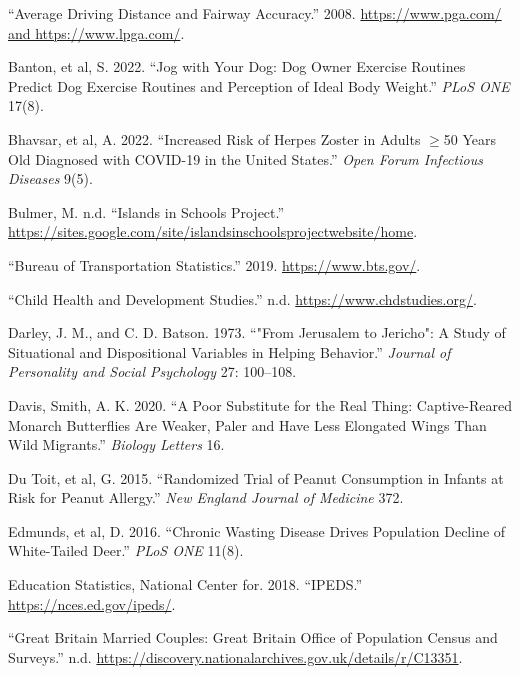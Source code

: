 \documentclass[
]{report}
\newlength{\cslhangindent}
\newenvironment{CSLReferences}[2] %
 {\begin{list}{}{%
  \setlength{\itemindent}{0pt}
  \setlength{\leftmargin}{0pt}
  \setlength{\parsep}{0pt}
  \ifodd #1
   \setlength{\leftmargin}{\cslhangindent}
   \setlength{\itemindent}{-1\cslhangindent}
  \fi
  \setlength{\itemsep}{#2\baselineskip}}}
 {\end{list}}
\begin{document}
\label{refs}
\begin{CSLReferences}{1}{0}
{``Average Driving Distance and Fairway Accuracy.''} 2008. \href{https://www.pga.com/\%20and\%20https://www.lpga.com/}{https://www.pga.com/ and https://www.lpga.com/}.

Banton, et al, S. 2022. {``Jog with Your Dog: Dog Owner Exercise Routines Predict Dog Exercise Routines and Perception of Ideal Body Weight.''} \emph{PLoS ONE} 17(8).

Bhavsar, et al, A. 2022. {``Increased Risk of Herpes Zoster in Adults \(\geq\)50 Years Old Diagnosed with COVID-19 in the United States.''} \emph{Open Forum Infectious Diseases} 9(5).

Bulmer, M. n.d. {``Islands in Schools Project.''} \url{https://sites.google.com/site/islandsinschoolsprojectwebsite/home}.

{``Bureau of Transportation Statistics.''} 2019. \url{https://www.bts.gov/}.

{``Child Health and Development Studies.''} n.d. \url{https://www.chdstudies.org/}.

Darley, J. M., and C. D. Batson. 1973. {``"From Jerusalem to Jericho": A Study of Situational and Dispositional Variables in Helping Behavior.''} \emph{Journal of Personality and Social Psychology} 27: 100--108.

Davis, Smith, A. K. 2020. {``A Poor Substitute for the Real Thing: Captive-Reared Monarch Butterflies Are Weaker, Paler and Have Less Elongated Wings Than Wild Migrants.''} \emph{Biology Letters} 16.

Du Toit, et al, G. 2015. {``Randomized Trial of Peanut Consumption in Infants at Risk for Peanut Allergy.''} \emph{New England Journal of Medicine} 372.

Edmunds, et al, D. 2016. {``Chronic Wasting Disease Drives Population Decline of White-Tailed Deer.''} \emph{PLoS ONE} 11(8).

Education Statistics, National Center for. 2018. {``IPEDS.''} \url{https://nces.ed.gov/ipeds/}.

{``Great Britain Married Couples: Great Britain Office of Population Census and Surveys.''} n.d. \url{https://discovery.nationalarchives.gov.uk/details/r/C13351}.


\end{CSLReferences}
\end{document}
